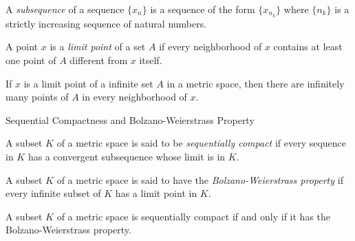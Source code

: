 \documentclass[12pt, a4paper]{article}
\begin{document}
\vspace{10pt}

\begin{definition}[Subsequence]
    A \textit{subsequence} of a sequence $\{x_n\}$ is a sequence of the form $\{x_{n_k}\}$ where $\{n_k\}$ is a strictly increasing sequence of natural numbers.
\end{definition}

\vspace{200pt}

\begin{definition}
    A point $x$ is a \textit{limit point} of a set $A$ if every neighborhood of $x$ contains at least one point of $A$ different from $x$ itself.
\end{definition}

\clearpage

\begin{theorem}
    If $x$ is a limit point of a infinite set $A$ in a metric space, then there are infinitely many points of $A$ in every neighborhood of $x$.
\end{theorem}

\clearpage

\begin{heading}
    Sequential Compactness and Bolzano-Weierstrass Property
\end{heading}

\vspace{10pt}

\begin{definition}
    A subset $K$ of a metric space is said to be \textit{sequentially compact} if every sequence in $K$ has a convergent subsequence whose limit is in $K$.
\end{definition}

\vspace{200pt}

\begin{definition}
    A subset $K$ of a metric space is said to have the \textit{Bolzano-Weierstrass property} if every infinite subset of $K$ has a limit point in $K$.
\end{definition}

\clearpage

\begin{theorem}
    A subset $K$ of a metric space is sequentially compact if and only if it has the Bolzano-Weierstrass property.
\end{theorem}
\end{document}

